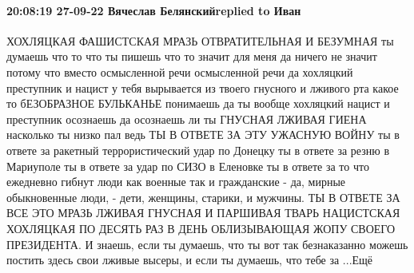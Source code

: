  
 
 
 
 

\paragraph{20:08:19 27-09-22 Вячеслав Белянскийreplied to Иван}

ХОХЛЯЦКАЯ ФАШИСТСКАЯ МРАЗЬ ОТВРАТИТЕЛЬНАЯ И БЕЗУМНАЯ ты думаешь что то что ты
пишешь что то значит для меня да ничего не значит потому что вместо осмысленной
речи осмысленной речи да хохляцкий преступник и нацист у тебя вырывается из
твоего гнусного и лживого рта какое то бЕЗОБРАЗНОЕ БУЛЬКАНЬЕ понимаешь да ты
вообще хохляцкий нацист и преступник осознаешь да осознаешь ли ты ГНУСНАЯ
ЛЖИВАЯ ГИЕНА насколько ты низко пал ведь ТЫ В ОТВЕТЕ ЗА ЭТУ УЖАСНУЮ ВОЙНУ ты в
ответе за ракетный террористический удар по Донецку ты в ответе за резню в
Мариуполе ты в ответе за удар по СИЗО в Еленовке ты в ответе за то что
ежедневно гибнут люди как военные так и гражданские - да, мирные обыкновенные
люди, - дети, женщины, старики, и мужчины. ТЫ В ОТВЕТЕ ЗА ВСЕ ЭТО МРАЗЬ ЛЖИВАЯ
ГНУСНАЯ И ПАРШИВАЯ ТВАРЬ НАЦИСТСКАЯ ХОХЛЯЦКАЯ ПО ДЕСЯТЬ РАЗ В ДЕНЬ ОБЛИЗЫВАЮЩАЯ
ЖОПУ СВОЕГО ПРЕЗИДЕНТА. И знаешь, если ты думаешь, что ты вот так безнаказанно
можешь постить здесь свои лживые высеры, и если ты думаешь, что тебе за ...Ещё
